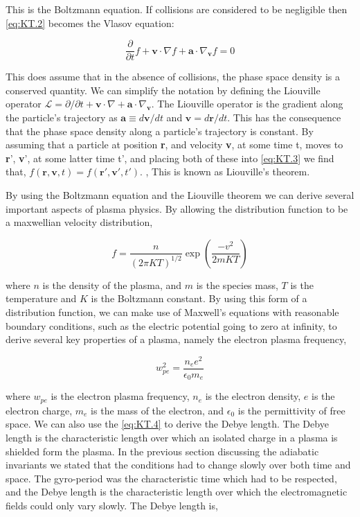 \documentclass[utf8]{report}
\begin{document}
This is the Boltzmann equation. If collisions are considered to be negligible then \ref{eq:KT.2} becomes the Vlasov equation: 

\begin{equation}
    \frac{\partial}{\partial t} f + \textbf{v} \cdot \nabla f + \textbf{a} \cdot \nabla_{\textbf{v}} f = 0
    \label{eq:KT.3}
\end{equation}

This does assume that in the absence of collisions, the phase space density is a conserved quantity. We can simplify the notation by defining the Liouville operator $\mathcal{L} = \partial / \partial t + \textbf{v} \cdot \nabla + \textbf{a} \cdot \nabla_{\textbf{v}}$. The Liouville operator is the gradient along the particle's trajectory as $\textbf{a} \equiv d\textbf{v}/dt$ and $\textbf{v}=d\textbf{r}/dt$. This has the consequence that the phase space density along a particle's trajectory is constant. By assuming that a particle at position \textbf{r}, and velocity \textbf{v}, at some time t, moves to \textbf{r}', \textbf{v}', at some latter time t', and placing both of these into \ref{eq:KT.3} we find that,  $f(\textbf{r}, \textbf{v}, t) = f(\textbf{r}', \textbf{v}', t')$. , This is known as Liouville's theorem.

By using the Boltzmann equation and the Liouville theorem we can derive several important aspects of plasma physics. By allowing the distribution function to be a maxwellian velocity distribution, 

\begin{equation}
    f = \frac{n}{(2\pi KT)^{1/2}}\exp(\frac{-v^{2}}{2mKT})
    \label{eq:KT.4}
\end{equation}

where $n$ is the density of the plasma, and $m$ is the species mass, $T$ is the temperature and $K$ is the Boltzmann constant. 
By using this form of a distribution function, we can make use of Maxwell's equations with reasonable boundary conditions, such as the electric potential going to zero at infinity, to derive several key properties of a plasma, namely the electron plasma frequency, 

\begin{equation}
    w^{2}_{pe} = \frac{n_{e} e^{2}}{\epsilon_{0} m_{e}}
    \label{eq:KT.5}
\end{equation}

where $w_{pe}$ is the electron plasma frequency, $n_{e}$ is the electron density, $e$ is the electron charge, $m_{e}$ is the mass of the electron, and $\epsilon_{0}$ is the permittivity of free space. We can also use the \ref{eq:KT.4} to derive the Debye length. The Debye length is the characteristic length over which an isolated charge in a plasma is shielded form the plasma. In the previous section discussing the adiabatic invariants we stated that the conditions had to change slowly over both time and space. The gyro-period was the characteristic time which had to be respected, and the Debye length is the characteristic length over which the electromagnetic fields could only vary slowly. The Debye length is, 
\end{document}
